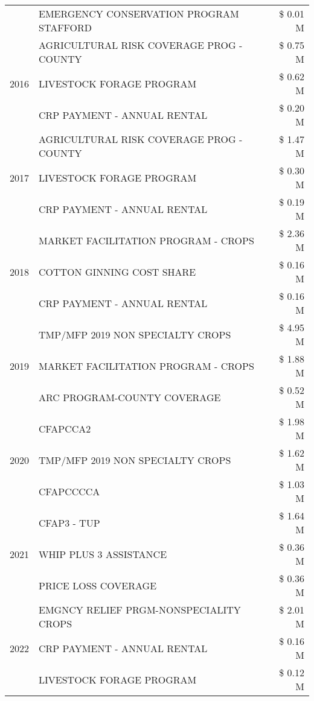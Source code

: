 \begin{tabular}{llr}
 & EMERGENCY CONSERVATION PROGRAM STAFFORD & \$ 0.01 M \\
\cline{1-3}
\multirow[t]{3}{*}{2016} & AGRICULTURAL RISK COVERAGE PROG - COUNTY & \$ 0.75 M \\
 & LIVESTOCK FORAGE PROGRAM & \$ 0.62 M \\
 & CRP PAYMENT - ANNUAL RENTAL & \$ 0.20 M \\
\cline{1-3}
\multirow[t]{3}{*}{2017} & AGRICULTURAL RISK COVERAGE PROG - COUNTY & \$ 1.47 M \\
 & LIVESTOCK FORAGE PROGRAM & \$ 0.30 M \\
 & CRP PAYMENT - ANNUAL RENTAL & \$ 0.19 M \\
\cline{1-3}
\multirow[t]{3}{*}{2018} & MARKET FACILITATION PROGRAM - CROPS & \$ 2.36 M \\
 & COTTON GINNING COST SHARE & \$ 0.16 M \\
 & CRP PAYMENT - ANNUAL RENTAL & \$ 0.16 M \\
\cline{1-3}
\multirow[t]{3}{*}{2019} & TMP/MFP 2019 NON SPECIALTY CROPS & \$ 4.95 M \\
 & MARKET FACILITATION PROGRAM - CROPS & \$ 1.88 M \\
 & ARC PROGRAM-COUNTY COVERAGE & \$ 0.52 M \\
\cline{1-3}
\multirow[t]{3}{*}{2020} & CFAPCCA2 & \$ 1.98 M \\
 & TMP/MFP 2019 NON SPECIALTY CROPS & \$ 1.62 M \\
 & CFAPCCCCA & \$ 1.03 M \\
\cline{1-3}
\multirow[t]{3}{*}{2021} & CFAP3 - TUP & \$ 1.64 M \\
 & WHIP PLUS 3 ASSISTANCE & \$ 0.36 M \\
 & PRICE LOSS COVERAGE & \$ 0.36 M \\
\cline{1-3}
\multirow[t]{3}{*}{2022} & EMGNCY RELIEF PRGM-NONSPECIALITY CROPS & \$ 2.01 M \\
 & CRP PAYMENT - ANNUAL RENTAL & \$ 0.16 M \\
 & LIVESTOCK FORAGE PROGRAM & \$ 0.12 M \\
\cline{1-3}
\bottomrule
\end{tabular}
